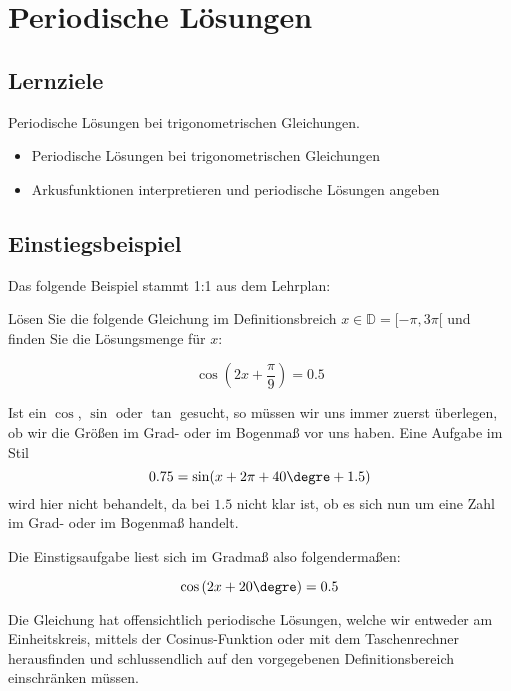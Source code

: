 
\section{Periodische Lösungen}

\subsection*{Lernziele}

Periodische Lösungen bei trigonometrischen Gleichungen.

\begin{itemize}
\item Periodische Lösungen bei trigonometrischen Gleichungen
\item Arkusfunktionen interpretieren und periodische Lösungen angeben
\end{itemize}



\subsection{Einstiegsbeispiel}
Das folgende Beispiel stammt 1:1 aus dem Lehrplan:

Lösen Sie die folgende Gleichung im Definitionsbreich $x \in \mathbb{D} = [ -\pi, 3\pi[$ und finden Sie die Lösungsmenge für $x$:

$$\cos\left(2x+\frac{\pi}{9}\right) = 0.5$$

\begin{bemerkung}{}{}
  Ist ein $\cos$, $\sin$ oder $\tan$ gesucht, so müssen wir uns immer zuerst überlegen, ob wir die Größen im Grad- oder im Bogenmaß vor uns haben. Eine Aufgabe im Stil $$0.75 = \sin(x + 2\pi + 40\degre + 1.5)$$ wird hier nicht behandelt, da bei $1.5$ nicht klar ist, ob es sich nun um eine Zahl im Grad- oder im Bogenmaß handelt.
  \end{bemerkung}

Die Einstigsaufgabe liest sich im Gradmaß also folgendermaßen:

$$\cos\left(2x+20\degre\right) = 0.5$$

Die Gleichung hat offensichtlich periodische Lösungen, welche wir entweder am Einheitskreis, mittels der Cosinus-Funktion oder mit dem Taschenrechner herausfinden und schlussendlich auf den vorgegebenen Definitionsbereich einschränken müssen.
\newpage



